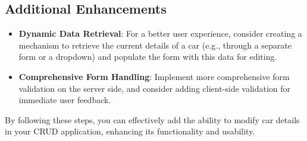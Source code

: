 \documentclass[11pt]{article}
\begin{document}
\subsection{Additional Enhancements}
\label{sec:org6db0be5}
\begin{itemize}
\item \textbf{Dynamic Data Retrieval}: For a better user experience, consider
creating a mechanism to retrieve the current details of a car (e.g.,
through a separate form or a dropdown) and populate the form with this
data for editing.
\item \textbf{Comprehensive Form Handling}: Implement more comprehensive form
validation on the server side, and consider adding client-side
validation for immediate user feedback.
\end{itemize}

By following these steps, you can effectively add the ability to modify
car details in your CRUD application, enhancing its functionality and
usability.
\end{document}
